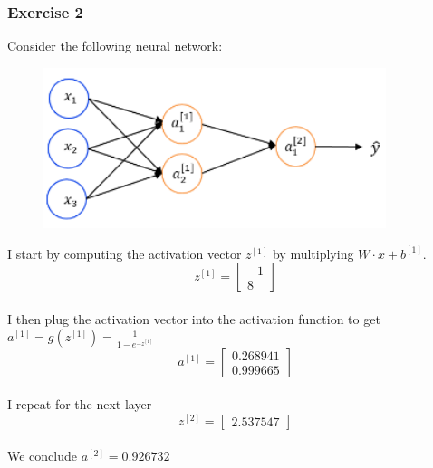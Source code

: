 \subsubsection{Exercise 2}
Consider the following neural network:
\begin{figure}[htbp]
    \centering
    \includegraphics[width=10cm]{ExerciseBook/01-NeuralNetwork/exercise2.png}\newline
\end{figure}
I start by computing the activation vector $z^{[1]}$ by multiplying $W\cdot x+b^{[1]}$.
\[ 
    z^{[1]}=
    \begin{bmatrix}
        -1 \\
        8 
    \end{bmatrix}
\]
\\I then plug the activation vector into the activation function to get $a^{[1]} = g(z^{[1]}) = \frac{1}{1-e^{-z^{[1]}}}$
\[ 
    a^{[1]}=
    \begin{bmatrix}
        0.268941 \\
        0.999665
    \end{bmatrix}
\]\\I repeat for the next layer
\[ 
    z^{[2]}=
    \begin{bmatrix}
        2.537547
    \end{bmatrix}
\]
\\We conclude $a^{[2]}=0.926732$

